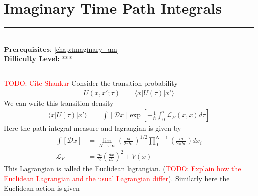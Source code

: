 \documentclass[book.tex]{subfiles}
\begin{document}
\chapter{Imaginary Time Path Integrals}

\label{chap:imaginary_path}
\noindent\rule{11cm}{0.4pt} \\
\textbf{Prerequisites:}  \autoref{chap:imaginary_qm} \\
\textbf{Difficulty Level:} *** \\
\noindent\rule{11cm}{0.4pt}
\vspace{5mm}
\textcolor{red}{TODO: Cite Shankar}
Consider the transition probability
\begin{align}
    U(x, x'; \tau) &= \langle x | U(\tau) | x'\rangle
\end{align}
We can write this transition density
\begin{align}
    \langle x | U(\tau) | x' \rangle &= \int [\mathcal{D}x] \exp \left [ -\frac{1}{\hbar} \int_0^\tau  \mathcal{L}_E(x,\bar{x}) d\tau \right]
\end{align}
Here the path integral measure and lagrangian is given by
\begin{align}
    \int [ \mathcal{D}x] &= \lim_{N \to \infty} \left ( \frac{m}{2\pi\hbar \epsilon} \right )^{1/2}\prod_0^{N-1} \left ( \frac{m}{2\pi\hbar \epsilon}\right ) dx_i \\
    \mathcal{L}_E &= \frac{m}{2}\left ( \frac{dx}{d\tau}\right )^2 + V(x)
\end{align}
This Lagrangian is called the Euclidean lagrangian.
(\textcolor{red}{TODO: Explain how the Euclidean Lagrangian and the usual Lagrangian differ}). Similarly here the Euclidean action is given 
\end{document}
